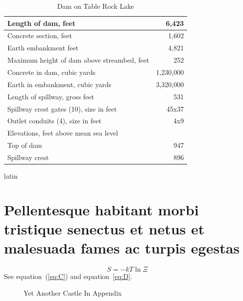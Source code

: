 \documentclass{fidata-report-template}
\begin{document}
\begin{table}
  \centering
  \caption{Dam on Table Rock Lake}
  \label{tab:Dam}
  \footnotesize\sffamily
  \begin{tabular}{|l|r|}
    \hline
    Length of dam, feet &6,423\\
    \hline
    Concrete section, feet &1,602\\
    \hline
    Earth embankment feet &4,821\\
    \hline
    Maximum height of dam above streambed, feet &252\\
    \hline
    Concrete in dam, cubic yards &1,230,000\\
    \hline
    Earth in embankment, cubic yards &3,320,000\\
    \hline
    Length of spillway, gross feet &531\\
    \hline
    Spillway crest gates (10), size in feet &45x37\\
    \hline
    Outlet conduits (4), size in feet &4x9\\
    \hline
    Elevations, feet above mean sea level & \\
    \hspace{20pt}Top of dam & 947\\
    \hspace{20pt}Spillway crest & 896\\
    \hline
  \end{tabular}
\end{table}

\begin{otherlanguage*}{latin}

\lipsum[27]

\chapter{Pellentesque habitant
  morbi tristique senectus et netus et malesuada fames ac turpis
  egestas}

\lipsum[16-22]

\end{otherlanguage*}

\begin{equation}
  \label{eq:U}
  S = -kT\ln\Xi
\end{equation}
See equation~(\ref{eq:C}) and equation~\eqref{eq:D}.

\begin{figure}
  \centering
  \caption{Yet Another Castle In Appendix}
  \label{fig:castle2}
\end{figure}
\end{document}
